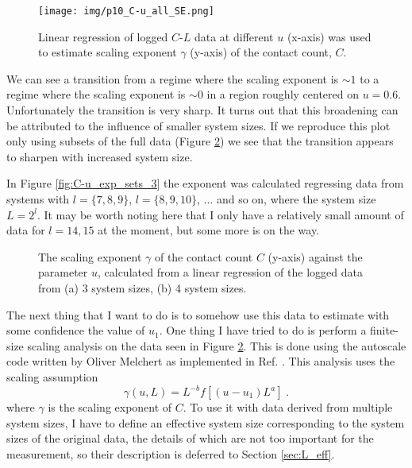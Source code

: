 \documentclass[a4paper,10pt]{article}
\newcommand{\fref}[1]{Figure \ref{#1}}
\newcommand{\rref}[1]{Ref. \cite{#1}}
\newcommand{\sref}[1]{Section \ref{#1}}
\begin{document}
\begin{figure}[h!]
 \centering
 \texttt{[image: img/p10\_C-u\_all\_SE.png]}
 \caption{Linear regression of logged $C$-$L$ data at different $u$ (x-axis) was used to estimate scaling exponent $\gamma$ (y-axis) of the contact count, $C$.}
 \label{fig:C-u_exp}
\end{figure}
We can see a transition from a regime where the scaling exponent is $\sim 1$ to a regime where the scaling exponent is $\sim 0$ in a region roughly centered on $u = 0.6$. Unfortunately the transition is very sharp. It turns out that this broadening can be attributed to the influence of smaller system sizes. If we reproduce this plot only using subsets of the full data (\fref{fig:C-u_exp_sets}) we see that the transition appears to sharpen with increased system size.

In \fref{fig:C-u_exp_sets_3} the exponent was calculated regressing data from systems with $l=\{7,8,9\}$, $l=\{8,9,10\}$, ... and so on, where the system size $L = 2^l$. It may be worth noting here that I only have a relatively small amount of data for $l=14,15$ at the moment, but some more is on the way.

\begin{figure}[ht!]
 \centering
 \caption{The scaling exponent $\gamma$ of the contact count $C$ (y-axis) against the parameter $u$, calculated from a linear regression of the logged data from (a) 3 system sizes, (b) 4 system sizes.}
 \label{fig:C-u_exp_sets}
\end{figure}

The next thing that I want to do is to somehow use this data to estimate with some confidence the value of $u_1$. One thing I have tried to do is perform a finite-size scaling analysis on the data seen in \fref{fig:C-u_exp_sets}. This is done using the autoscale code written by Oliver Melchert \cite{Melchert2009} as implemented in \rref{Houdayer2004}. This analysis uses the scaling assumption
\begin{equation}\label{eq:scaling_ansatz}
  \gamma(u,L) = L^{-b} f[(u-u_1)L^a] \;.
\end{equation}
where $\gamma$ is the scaling exponent of $C$.
To use it with data derived from multiple system sizes, I have to define an effective system size corresponding to the system sizes of the original data, the details of which are not too important for the measurement, so their description is deferred to \sref{sec:L_eff}. 
\end{document}
